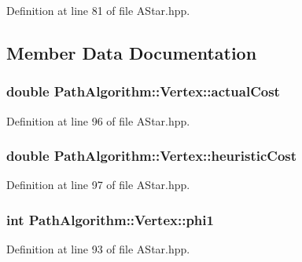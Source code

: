 Definition at line 81 of file A\+Star.\+hpp.



\subsection{Member Data Documentation}
\subsubsection[{\texorpdfstring{actual\+Cost}{actualCost}}]{\setlength{\rightskip}{0pt plus 5cm}double Path\+Algorithm\+::\+Vertex\+::actual\+Cost}\hypertarget{struct_path_algorithm_1_1_vertex_a8bac4752dead7e6f0eb4fe099eae1eaf}{}\label{struct_path_algorithm_1_1_vertex_a8bac4752dead7e6f0eb4fe099eae1eaf}


Definition at line 96 of file A\+Star.\+hpp.

\subsubsection[{\texorpdfstring{heuristic\+Cost}{heuristicCost}}]{\setlength{\rightskip}{0pt plus 5cm}double Path\+Algorithm\+::\+Vertex\+::heuristic\+Cost}\hypertarget{struct_path_algorithm_1_1_vertex_a316a72f6d405096010224df1a78b8c4d}{}\label{struct_path_algorithm_1_1_vertex_a316a72f6d405096010224df1a78b8c4d}


Definition at line 97 of file A\+Star.\+hpp.

\subsubsection[{\texorpdfstring{phi1}{phi1}}]{\setlength{\rightskip}{0pt plus 5cm}int Path\+Algorithm\+::\+Vertex\+::phi1}\hypertarget{struct_path_algorithm_1_1_vertex_a7ad47a3f8613026f8e0cd06e4d967bc1}{}\label{struct_path_algorithm_1_1_vertex_a7ad47a3f8613026f8e0cd06e4d967bc1}


Definition at line 93 of file A\+Star.\+hpp.

